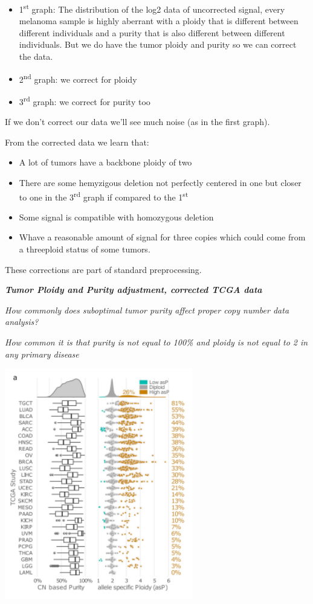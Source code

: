 \begin{itemize}
\item
  1\textsuperscript{st} graph: The distribution of the log2 data of uncorrected
  signal, every melanoma sample is highly aberrant with a ploidy that is
  different between different individuals and a purity that is also different
  between different individuals. But we do have the tumor ploidy and purity so
  we can correct the data.
\item
  2\textsuperscript{nd} graph: we correct for ploidy
\item
  3\textsuperscript{rd} graph: we correct for purity too
\end{itemize}

If we don't correct our data we'll see much noise (as in the first graph).

From the corrected data we learn that:

\begin{itemize}
\item
  A lot of tumors have a backbone ploidy of two
\item
  There are some hemyzigous deletion not perfectly centered in one but closer to
  one in the 3\textsuperscript{rd} graph if compared to the
  1\textsuperscript{st}
\item
  Some signal is compatible with homozygous deletion
\item
  Whave a reasonable amount of signal for three copies which could come from a
  threeploid status of some tumors.
\end{itemize}

These corrections are part of standard preprocessing.

\emph{\textbf{Tumor Ploidy and Purity adjustment, corrected TCGA data}}

\emph{How commonly does suboptimal tumor purity affect proper copy number data
analysis?}

\emph{How common it is that purity is not equal to 100\% and ploidy is not equal
to 2 in any primary disease}

\includegraphics[width=3.24375in,height=3.97569in]{image9.png}

